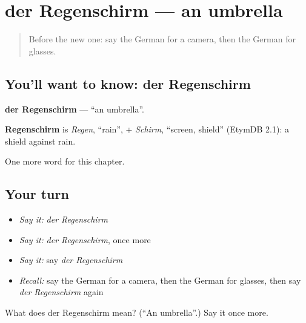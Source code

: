 \section[der Regenschirm]{der Regenschirm — an umbrella}

\label{lesson:GE-C116-regenschirm}



\begin{quote}
Before the new one: say the German for a camera, then the German for glasses.
\end{quote}

\subsection*{You'll want to know: der Regenschirm}
\textbf{der Regenschirm} — \textquotedblleft{}an umbrella\textquotedblright{}.

\begin{cousinweb}
\textbf{Regenschirm} is \emph{Regen}, \textquotedblleft{}rain\textquotedblright{}, + \emph{Schirm}, \textquotedblleft{}screen, shield\textquotedblright{} (EtymDB 2.1): a shield against rain.
\end{cousinweb}

\begin{grammarlens}[title={What you've built}]
One more word for this chapter.
\end{grammarlens}

\subsection*{Your turn}
\begin{itemize}
\raggedright
  \item \emph{Say it:} \emph{der Regenschirm}
  \item \emph{Say it:} \emph{der Regenschirm}, once more
  \item \emph{Say it:} say \emph{der Regenschirm}
  \item \emph{Recall:} say the German for a camera, then the German for glasses, then say \emph{der Regenschirm} again
\end{itemize}

\begin{tcolorbox}[breakable,colback=teal!4,colframe=teal!35!black,title={Before you move on}]
What does der Regenschirm mean? (\textquotedblleft{}An umbrella\textquotedblright{}.) Say it once more.
\end{tcolorbox}
